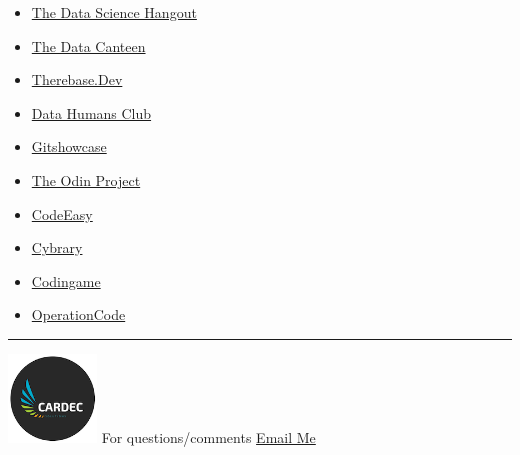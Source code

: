 \documentclass[
]{article}
\providecommand{\tightlist}{%
  \setlength{\itemsep}{0pt}\setlength{\parskip}{0pt}}
\begin{document}
\begin{itemize}
\tightlist
\item
  \href{https://posit.co/data-science-hangout/}{The Data Science
  Hangout}
\item
  \href{https://vetsindatascience.com/the-data-canteen}{The Data
  Canteen}
\item
  \href{https://www.therebase.dev}{Therebase.Dev}
\item
  \href{https://www.datahumans.club}{Data Humans Club}
\item
  \href{https://www.gitshowcase.com/}{Gitshowcase}
\item
  \href{https://www.theodinproject.com/home}{The Odin Project}
\item
  \href{https://codeeasy.io}{CodeEasy}
\item
  \href{https://www.cybrary.it/catalog/refined/}{Cybrary}
\item
  \href{https://www.codingame.com/start}{Codingame}
\item
  \href{https://operationcode.org/code_schools}{OperationCode}
\end{itemize}

\begin{center}\rule{0.5\linewidth}{0.5pt}\end{center}

\includegraphics[width=0.92708in,height=\textheight]{docs/CardecRndLogo.png}
For questions/comments \href{mailto:ocmain@gocardec.com}{Email Me}
\end{document}
